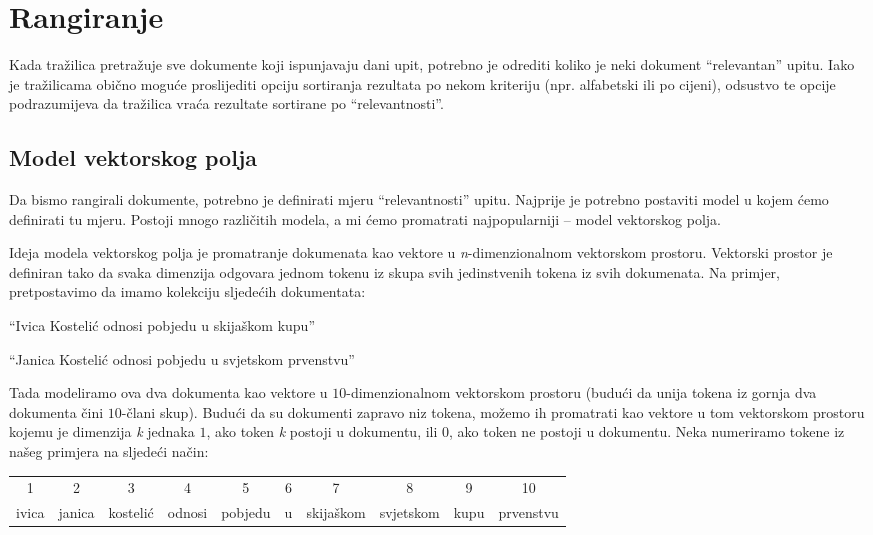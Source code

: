 \documentclass[a4paper,twoside,12pt]{scrreprt}
\begin{document}
\section{Rangiranje}

Kada tražilica pretražuje sve dokumente koji ispunjavaju dani upit, potrebno je odrediti koliko je neki dokument ``relevantan'' upitu. Iako je tražilicama obično moguće proslijediti opciju sortiranja rezultata po nekom kriteriju (npr. alfabetski ili po cijeni), odsustvo te opcije podrazumijeva da tražilica vraća rezultate sortirane po ``relevantnosti''.

\subsection{Model vektorskog polja}

Da bismo rangirali dokumente, potrebno je definirati mjeru ``relevantnosti'' upitu. Najprije je potrebno postaviti model u kojem ćemo definirati tu mjeru. Postoji mnogo različitih modela, a mi ćemo promatrati najpopularniji – model vektorskog polja.

Ideja modela vektorskog polja je promatranje dokumenata kao vektore u \textit{n}-dimenzionalnom vektorskom prostoru. Vektorski prostor je definiran tako da svaka dimenzija odgovara jednom tokenu iz skupa svih jedinstvenih tokena iz svih dokumenata. Na primjer, pretpostavimo da imamo kolekciju sljedećih dokumentata:

\begin{compactenum}
  \item ``Ivica Kostelić odnosi pobjedu u skijaškom kupu''
  \item ``Janica Kostelić odnosi pobjedu u svjetskom prvenstvu''
\end{compactenum}

Tada modeliramo ova dva dokumenta kao vektore u $10$-dimenzionalnom vektorskom prostoru (budući da unija tokena iz gornja dva dokumenta čini $10$-člani skup). Budući da su dokumenti zapravo niz tokena, možemo ih promatrati kao vektore u tom vektorskom prostoru kojemu je dimenzija \textit{k} jednaka $1$, ako token \textit{k} postoji u dokumentu, ili $0$, ako token ne postoji u dokumentu. Neka numeriramo tokene iz našeg primjera na sljedeći način:

\begin{center}
  \begin{tabular}{@{\enspace}c@{\enspace}c@{\enspace}c@{\enspace}c@{\enspace}c@{\enspace}c@{\enspace}c@{\enspace}c@{\enspace}c@{\enspace}c@{\enspace}}
    1     & 2      & 3        & 4      & 5       & 6 & 7         & 8         & 9    & 10        \\
    ivica & janica & kostelić & odnosi & pobjedu & u & skijaškom & svjetskom & kupu & prvenstvu \\
  \end{tabular}
\end{center}
\end{document}
